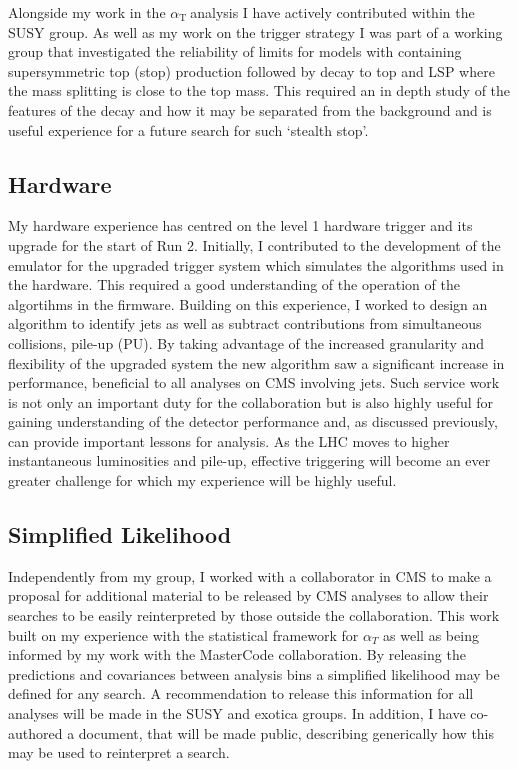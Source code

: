 \documentclass[11pt]{article}
\theoremstyle{plain} \numberwithin{equation}{section}
\theoremstyle{definition}
\DeclareRobustCommand{\alphat}{$\alpha_{\text{T}}~$}
\begin{document}
Alongside my work in the \alphat analysis I have actively contributed within the SUSY group.
As well as my work on the trigger strategy I was part of a working group that investigated
the reliability of limits for models with containing supersymmetric top (stop) production followed by decay 
to top and LSP where the mass splitting is close to the top mass. This required an in depth study of the features of the decay and how it 
may be separated from the background and is useful experience for a future search for such `stealth stop'.

\subsection*{Hardware}
My hardware experience has centred on the level 1 hardware trigger and its
upgrade for the start of Run 2. Initially, I contributed to the development of the emulator for the upgraded
trigger system which simulates the algorithms used in the hardware. This required a good understanding
of the operation of the algortihms in the firmware. Building on this experience, 
I worked to design an algorithm to identify jets as well as subtract contributions from simultaneous collisions, 
pile-up (PU). By taking advantage of the increased granularity and flexibility of the 
upgraded system the new algorithm saw a significant increase in performance, beneficial
to all analyses on CMS involving jets. Such service work is not only an important duty for the collaboration but is also
highly useful for gaining understanding of the detector performance and, as discussed previously,
can provide important lessons for analysis. As the LHC moves to higher instantaneous 
luminosities and pile-up, effective triggering will become an ever greater challenge 
for which my experience will be highly useful. 

\subsection*{Simplified Likelihood}
Independently from my group, I worked with a collaborator in CMS to make a proposal 
for additional material to be released by CMS analyses
to allow their searches to be easily reinterpreted by those outside the collaboration. 
This work built on my experience with the statistical framework for $\alpha_T$ as well as being 
informed by my work with the MasterCode collaboration. By releasing the predictions and covariances between analysis bins 
a simplified likelihood may be defined for any search. A recommendation to release this information for all analyses
will be made in the SUSY and exotica groups. In addition, I have co-authored a document,
that will be made public, describing generically how this may be used to reinterpret a search.
\end{document}
